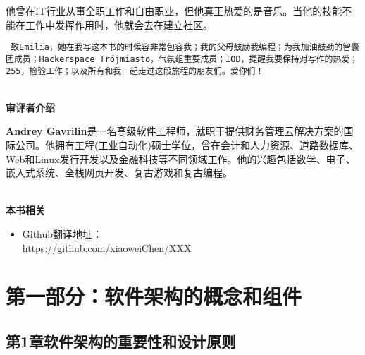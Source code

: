\documentclass[11pt,a4paper,UTF8]{book}
\begin{document}
\begin{sloppypar}
	他曾在IT行业从事全职工作和自由职业，但他真正热爱的是音乐。当他的技能不能在工作中发挥作用时，他就会去在建立社区。
	
	\begin{center}
	\tt
	致Emilia，她在我写这本书的时候容非常包容我；我的父母鼓励我编程；为我加油鼓劲的智囊团成员；Hackerspace Trójmiasto，气氛组重要成员；IOD，提醒我要保持对写作的热爱；255，检验工作；以及所有和我一起走过这段旅程的朋友们。爱你们！
	\end{center}
	
	\thispagestyle{empty}
	\hspace*{\fill} \\ %
	\noindent\textbf{审评者介绍}
	
	\textbf{Andrey Gavrilin}是一名高级软件工程师，就职于提供财务管理云解决方案的国际公司。他拥有工程(工业自动化)硕士学位，曾在会计和人力资源、道路数据库、Web和Linux发行开发以及金融科技等不同领域工作。他的兴趣包括数学、电子、嵌入式系统、全栈网页开发、复古游戏和复古编程。
	
	
	\hspace*{\fill} \\ %
	\noindent\textbf{本书相关}
	\begin{itemize}
		\item Github翻译地址：\\\url{https://github.com/xiaoweiChen/XXX}
	\end{itemize}
	\newpage
	
	\pagestyle{empty}
	
	
	\tableofcontents
	\newpage
	
	
	\color{white}
	\section*{第一部分：软件架构的概念和组件}
	\pagecolor{mygray}
	\textbf{}
	\newpage
	\color{black}
	\pagecolor{white}
	
	\subsection*{ 第1章\hspace{0.5cm}软件架构的重要性和设计原则}
	
	

\end{sloppypar}
\end{document}
